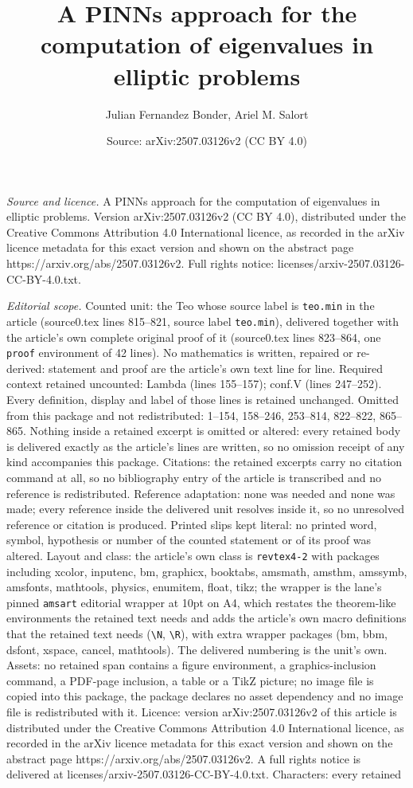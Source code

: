 \documentclass[10pt,a4paper]{amsart}
\title[A PINNs approach for the computation of eigenvalues in ellip]{A PINNs approach for the computation of eigenvalues in elliptic problems}
\author{Julian Fernandez Bonder, Ariel M. Salort}
\date{Source: arXiv:2507.03126v2 (CC BY 4.0)}
\begin{document}
\maketitle

\noindent\emph{Source and licence.} A PINNs approach for the computation of eigenvalues in elliptic problems. Version arXiv:2507.03126v2 (CC BY 4.0), distributed under the Creative Commons Attribution 4.0 International licence, as recorded in the arXiv licence metadata for this exact version and shown on the abstract page https://arxiv.org/abs/2507.03126v2. Full rights notice: licenses/arxiv-2507.03126-CC-BY-4.0.txt.\par\smallskip

\noindent\textit{Editorial scope.} Counted unit: the Teo whose source label is \texttt{teo.min} in the article (source0.tex lines 815--821, source label \texttt{teo.min}), delivered together with the article's own complete original proof of it (source0.tex lines 823--864, one \texttt{proof} environment of 42 lines). No mathematics is written, repaired or re-derived: statement and proof are the article's own text line for line. Required context retained uncounted: Lambda (lines 155--157); conf.V (lines 247--252). Every definition, display and label of those lines is retained unchanged. Omitted from this package and not redistributed: 1--154, 158--246, 253--814, 822--822, 865--865. Nothing inside a retained excerpt is omitted or altered: every retained body is delivered exactly as the article's lines are written, so no omission receipt of any kind accompanies this package. Citations: the retained excerpts carry no citation command at all, so no bibliography entry of the article is transcribed and no reference is redistributed. Reference adaptation: none was needed and none was made; every reference inside the delivered unit resolves inside it, so no unresolved reference or citation is produced. Printed slips kept literal: no printed word, symbol, hypothesis or number of the counted statement or of its proof was altered. Layout and class: the article's own class is \texttt{revtex4-2} with packages including xcolor, inputenc, bm, graphicx, booktabs, amsmath, amsthm, amssymb, amsfonts, mathtools, physics, enumitem, float, tikz; the wrapper is the lane's pinned \texttt{amsart} editorial wrapper at 10pt on A4, which restates the theorem-like environments the retained text needs and adds the article's own macro definitions that the retained text needs (\texttt{\textbackslash N}, \texttt{\textbackslash R}), with extra wrapper packages (bm, bbm, dsfont, xspace, cancel, mathtools). The delivered numbering is the unit's own. Assets: no retained span contains a figure environment, a graphics-inclusion command, a PDF-page inclusion, a table or a TikZ picture; no image file is copied into this package, the package declares no asset dependency and no image file is redistributed with it. Licence: version arXiv:2507.03126v2 of this article is distributed under the Creative Commons Attribution 4.0 International licence, as recorded in the arXiv licence metadata for this exact version and shown on the abstract page https://arxiv.org/abs/2507.03126v2. A full rights notice is delivered at licenses/arxiv-2507.03126-CC-BY-4.0.txt. Characters: every retained 
\end{document}
